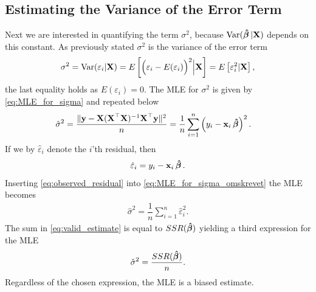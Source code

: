 \subsection{Estimating the Variance of the Error Term}
Next we are interested in quantifying the term $\sigma^2$, because $\operatorname{\text{Var}}(\operatorname{\boldsymbol{\hat{\beta}}}|\mathbf{X})$ depends on this constant.
As previously stated $\sigma^2$ is the variance of the error term
\begin{align*}
    \sigma^2 = \operatorname{\text{Var}}(\varepsilon_i | \mathbf{X}) =  E\left[\Big(\varepsilon_i - E(\varepsilon_i)\Big)^2 \Big| \mathbf{X}\right] = E\left[\varepsilon_i^2 | \mathbf{X} \right],
\end{align*}
the last equality holds as $E(\varepsilon_i) = 0$.
The MLE for $\sigma^2$ is given by \eqref{eq:MLE_for_sigma} and repeated below
\begin{align}\label{eq:MLE_for_sigma_omskrevet}
    \hat{\sigma}^2 &= \frac{\|\textbf{y} - \textbf{X}( \textbf{X}^\top\textbf{X} )^{-1}\textbf{X}^\top\textbf{y}\|^2}{n}
    = \dfrac{1}{n}\sum_{i=1}^n \left(y_i - \mathbf{x}_i\operatorname{\boldsymbol{\hat{\beta}}}\right)^2.
\end{align}
If we by $\hat{\varepsilon}_i$ denote the $i$'th residual, then
\begin{align}\label{eq:observed_residual}
    \hat{\varepsilon}_i = y_i - \mathbf{x}_i\operatorname{\boldsymbol{\hat{\beta}}}.
\end{align}
Inserting \eqref{eq:observed_residual} into \eqref{eq:MLE_for_sigma_omskrevet} the MLE becomes
\begin{align}\label{eq:valid_estimate}
    \hat{\sigma}^2 = \dfrac{1}{n}\sum_{i=1}^n \hat{\varepsilon}_i^2.
\end{align}
The sum in \eqref{eq:valid_estimate} is equal to $SSR(\operatorname{\boldsymbol{\hat{\beta}}})$ yielding a third expression for the MLE
\begin{align}
    \hat{\sigma}^2 = \frac{SSR(\operatorname{\boldsymbol{\hat{\beta}}})}{n}.
\end{align}
Regardless of the chosen expression, the MLE is a biased estimate.
